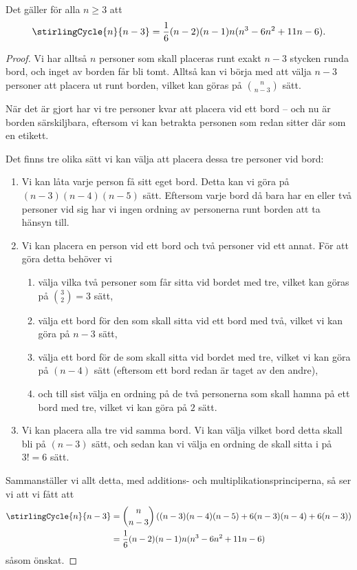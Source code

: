 \documentclass[nobib]{tufte-handout}
\begin{document}
\begin{proposition}
  Det gäller för alla $n \geq 3$ att
  $$\stirlingCycle{n}{n-3} = \frac{1}{6} (n - 2) (n - 1) n (n^3 - 6 n^2 + 11 n - 6).$$

  \begin{proof}
    Vi har alltså $n$ personer som skall placeras runt exakt $n - 3$ stycken runda bord, och inget av borden får bli tomt. Alltså kan vi börja med att välja $n - 3$ personer att placera ut runt borden, vilket kan göras på $\binom{n}{n - 3}$ sätt.

    När det är gjort har vi tre personer kvar att placera vid ett bord -- och nu är borden särskiljbara, eftersom vi kan betrakta personen som redan sitter där som en etikett.

    Det finns tre olika sätt vi kan välja att placera dessa tre personer vid bord:
    \begin{enumerate}
      \item Vi kan låta varje person få sitt eget bord. Detta kan vi göra på $(n-3)(n-4)(n-5)$ sätt. Eftersom varje bord då bara har en eller två personer vid sig har vi ingen ordning av personerna runt borden att ta hänsyn till.
      \item Vi kan placera en person vid ett bord och två personer vid ett annat. För att göra detta behöver vi
      \begin{enumerate}
        \item välja vilka två personer som får sitta vid bordet med tre, vilket kan göras på $\binom{3}{2} = 3$ sätt,
        \item välja ett bord för den som skall sitta vid ett bord med två, vilket vi kan göra på $n-3$ sätt,
        \item välja ett bord för de som skall sitta vid bordet med tre, vilket vi kan göra på $(n-4)$ sätt (eftersom ett bord redan är taget av den andre),
        \item och till sist välja en ordning på de två personerna som skall hamna på ett bord med tre, vilket vi kan göra på $2$ sätt.
      \end{enumerate}
      \item Vi kan placera alla tre vid samma bord. Vi kan välja vilket bord detta skall bli på $(n-3)$ sätt, och sedan kan vi välja en ordning de skall sitta i på $3! = 6$ sätt.
    \end{enumerate}

    Sammanställer vi allt detta, med additions- och multiplikationsprinciperna, så ser vi att vi fått att
    \begin{align*}
      \stirlingCycle{n}{n-3} &= \binom{n}{n-3}\left((n-3)(n-4)(n-5) + 6(n-3)(n-4) + 6(n-3)\right)\\
      &= \frac{1}{6} (n - 2) (n - 1) n (n^3 - 6 n^2 + 11 n - 6)
    \end{align*}
    såsom önskat.
  \end{proof}
\end{proposition}
\end{document}

